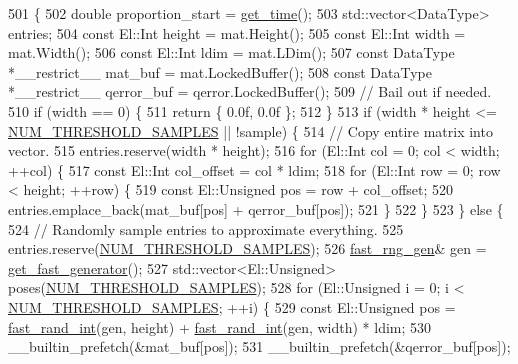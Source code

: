 \begin{DoxyCode}
501                                                                   \{
502   \textcolor{keywordtype}{double} proportion\_start = \hyperlink{namespacelbann_a478d36031ff0659893c4322cd856157f}{get\_time}();
503   std::vector<DataType> entries;
504   \textcolor{keyword}{const} El::Int height = mat.Height();
505   \textcolor{keyword}{const} El::Int width = mat.Width();
506   \textcolor{keyword}{const} El::Int ldim = mat.LDim();
507   \textcolor{keyword}{const} DataType *\_\_restrict\_\_ mat\_buf = mat.LockedBuffer();
508   \textcolor{keyword}{const} DataType *\_\_restrict\_\_ qerror\_buf = qerror.LockedBuffer();
509   \textcolor{comment}{// Bail out if needed.}
510   \textcolor{keywordflow}{if} (width == 0) \{
511     \textcolor{keywordflow}{return} \{ 0.0f, 0.0f \};
512   \}
513   \textcolor{keywordflow}{if} (width * height <= \hyperlink{classlbann_1_1lbann__quantizer_a7745dbc282bebe812ff5523a4b3df3f2}{NUM\_THRESHOLD\_SAMPLES} || !sample) \{
514     \textcolor{comment}{// Copy entire matrix into vector.}
515     entries.reserve(width * height);
516     \textcolor{keywordflow}{for} (El::Int col = 0; col < width; ++col) \{
517       \textcolor{keyword}{const} El::Int col\_offset = col * ldim;
518       \textcolor{keywordflow}{for} (El::Int row = 0; row < height; ++row) \{
519         \textcolor{keyword}{const} El::Unsigned pos = row + col\_offset;
520         entries.emplace\_back(mat\_buf[pos] + qerror\_buf[pos]);
521       \}
522     \}
523   \} \textcolor{keywordflow}{else} \{
524     \textcolor{comment}{// Randomly sample entries to approximate everything.}
525     entries.reserve(\hyperlink{classlbann_1_1lbann__quantizer_a7745dbc282bebe812ff5523a4b3df3f2}{NUM\_THRESHOLD\_SAMPLES});
526     \hyperlink{namespacelbann_af16616ffa6a3616836eabadd6ce837ec}{fast\_rng\_gen}& gen = \hyperlink{namespacelbann_ae6ce9c2fdec6f81803f6b1a6555c31c5}{get\_fast\_generator}();
527     std::vector<El::Unsigned> poses(\hyperlink{classlbann_1_1lbann__quantizer_a7745dbc282bebe812ff5523a4b3df3f2}{NUM\_THRESHOLD\_SAMPLES});
528     \textcolor{keywordflow}{for} (El::Unsigned i = 0; i < \hyperlink{classlbann_1_1lbann__quantizer_a7745dbc282bebe812ff5523a4b3df3f2}{NUM\_THRESHOLD\_SAMPLES}; ++i) \{
529       \textcolor{keyword}{const} El::Unsigned pos = \hyperlink{namespacelbann_a557aaed6267e7aaf583a75149e9c670c}{fast\_rand\_int}(gen, height) + 
      \hyperlink{namespacelbann_a557aaed6267e7aaf583a75149e9c670c}{fast\_rand\_int}(gen, width) * ldim;
530       \_\_builtin\_prefetch(&mat\_buf[pos]);
531       \_\_builtin\_prefetch(&qerror\_buf[pos]);

\end{DoxyCode}
